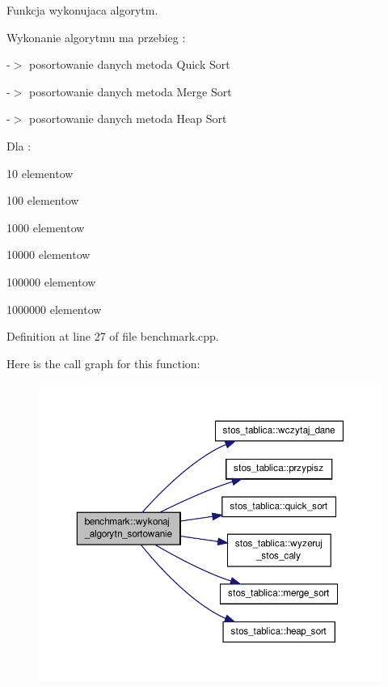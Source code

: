 Funkcja wykonujaca algorytm. 

Wykonanie algorytmu ma przebieg \-:\par
 -\/$>$ posortowanie danych metoda Quick Sort\par
 -\/$>$ posortowanie danych metoda Merge Sort\par
 -\/$>$ posortowanie danych metoda Heap Sort\par
 \par
 Dla \-:\par

\begin{DoxyItemize}
\item 10 elementow \par

\item 100 elementow \par

\item 1000 elementow \par

\item 10000 elementow \par

\item 100000 elementow \par

\item 1000000 elementow \par
 
\end{DoxyItemize}

Definition at line 27 of file benchmark.\-cpp.



Here is the call graph for this function\-:\nopagebreak
\begin{figure}[H]
\begin{center}
\leavevmode
\includegraphics[width=350pt]{classbenchmark_a845da6947383df74d871e273bf225721_cgraph}
\end{center}
\end{figure}




